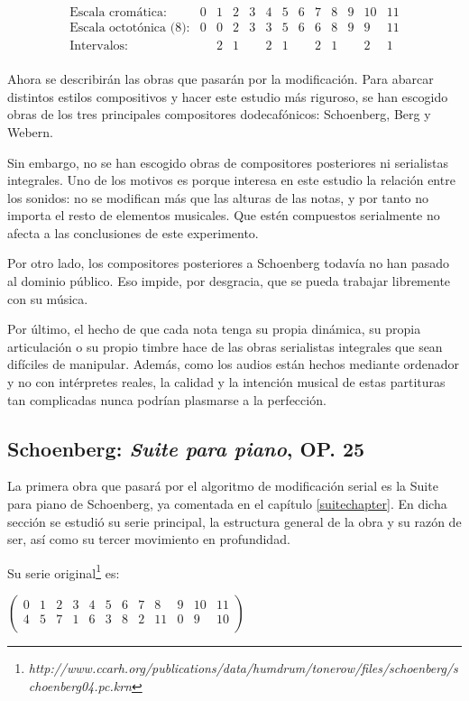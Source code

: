         \[\left.\begin{matrix}
        \text{Escala cromática:}&0&1&2&3&4&5&6&7&8&9&10&11\\
        \text{Escala octotónica (8):}&0&0&2&3&3&5&6&6&8&9&9&11\\
        \text{Intervalos:}&&2&1&&2&1&&2&1&&2&1\\
        \end{matrix}\right.\]
        
        Ahora se describirán las obras que pasarán por la modificación. Para abarcar distintos estilos compositivos y hacer este estudio más riguroso, se han escogido obras de los tres principales compositores dodecafónicos: Schoenberg, Berg y Webern.
        
        Sin embargo, no se han escogido obras de compositores posteriores ni serialistas integrales. Uno de los motivos es porque interesa en este estudio la relación entre los sonidos: no se modifican más que las alturas de las notas, y por tanto no importa el resto de elementos musicales. Que estén compuestos serialmente no afecta a las conclusiones de este experimento.
        
        Por otro lado, los compositores posteriores a Schoenberg todavía no han pasado al dominio público. Eso impide, por desgracia, que se pueda trabajar libremente con su música.
        
        Por último, el hecho de que cada nota tenga su propia dinámica, su propia articulación o su propio timbre hace de las obras serialistas integrales que sean difíciles de manipular. Además, como los audios están hechos mediante ordenador y no con intérpretes reales, la calidad y la intención musical de estas partituras tan complicadas nunca podrían plasmarse a la perfección.
        
        \subsection*{Schoenberg: \textit{Suite para piano}, OP. 25}
        La primera obra que pasará por el algoritmo de modificación serial es la Suite para piano de Schoenberg, ya comentada en el capítulo \ref{suitechapter}. En dicha sección se estudió su serie principal, la estructura general de la obra y su razón de ser, así como su tercer movimiento en profundidad.
        
        Su serie original\footnote{\textit{http://www.ccarh.org/publications/data/humdrum/tonerow/files/schoenberg/schoenberg04.pc.krn}} es: 
        \begin{footnotesize}
        	$\left(\begin{matrix}0&1&2&3&4&5&6&7&8&9&10&11\\4&5&7&1&6&3&8&2&11&0&9&10\\\end{matrix}\right)$	
        \end{footnotesize}
        
